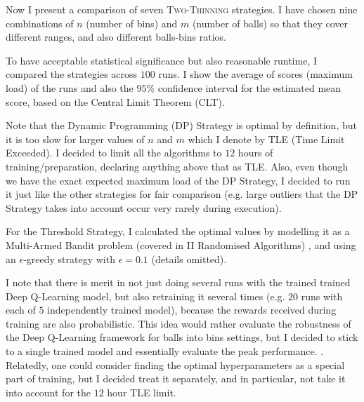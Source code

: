 Now I present a comparison of seven \textsc{Two-Thinning} strategies. I have chosen nine combinations of $n$ (number of bins) and $m$ (number of balls) so that they cover different ranges, and also different balls-bins ratios.


To have acceptable statistical significance but also reasonable runtime, I compared the strategies across $100$ runs. I show the average of scores (maximum load) of the runs and also the $95\%$ confidence interval for the estimated mean score, based on the Central Limit Theorem (CLT). 


Note that the Dynamic Programming (DP) Strategy is optimal by definition, but it is too slow for larger values of $n$ and $m$ which I denote by TLE (Time Limit Exceeded). I decided to limit all the algorithms to $12$ hours of training/preparation, declaring anything above that as TLE. Also, even though we have the exact expected maximum load of the DP Strategy, I decided to run it just like the other strategies for fair comparison (e.g. large outliers that the DP Strategy takes into account occur very rarely during execution).


For the Threshold Strategy, I calculated the optimal values by modelling it as a Multi-Armed Bandit problem (covered in II Randomised Algorithms) \cite{katehakis1987multiarmedbandit}, and using an $\epsilon$-greedy strategy with $\epsilon=0.1$ (details omitted).


I note that there is merit in not just doing several runs with the trained trained Deep Q-Learning model, but also retraining it several times (e.g. $20$ runs with each of $5$ independently trained model), because the rewards received during training are also probabilistic. This idea would rather evaluate the robustness of the Deep Q-Learning framework for balls into bins settings, but I decided to stick to a single trained model and essentially evaluate the peak performance. . Relatedly, one could consider finding the optimal hyperparameters as a special part of training, but I decided treat it separately, and in particular, not take it into account for the $12$ hour TLE limit.



